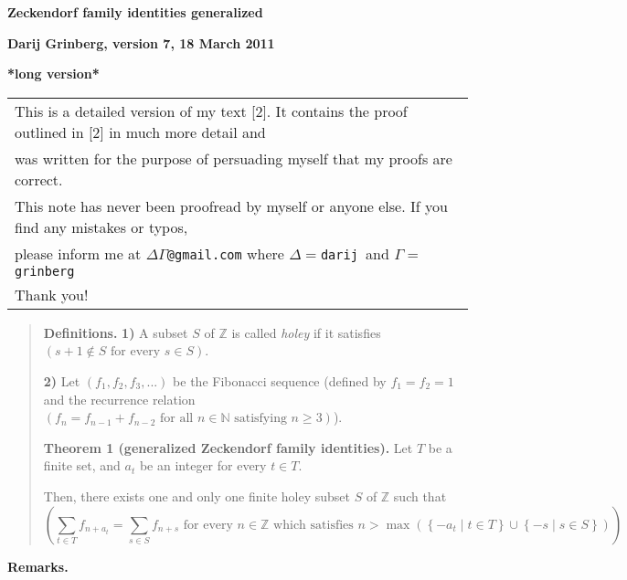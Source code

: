 \documentclass[12pt,final,notitlepage,onecolumn]{article}%
\begin{document}


\begin{center}
\textbf{Zeckendorf family identities generalized}

\textbf{Darij Grinberg, version 7, 18 March 2011}

\textbf{*long version*}
\end{center}

%

\begin{tabular}
[c]{||l||}\hline\hline
This is a detailed version of my text [2]. It contains the proof outlined in
[2] in much more detail and\\
was written for the purpose of persuading myself that my proofs are correct.\\
This note has never been proofread by myself or anyone else. If you find any
mistakes or typos,\\
please inform me at $\Delta\Gamma$\texttt{@gmail.com} where $\Delta
=$\texttt{darij }and $\Gamma=$\texttt{grinberg}\\
Thank you!\\\hline\hline
\end{tabular}


\bigskip

\begin{quote}
\textbf{Definitions.} \textbf{1)} A subset $S$ of $\mathbb{Z}$ is called
\textit{holey} if it satisfies $\left(  s+1\notin S\text{ for every }s\in
S\right)  $.

\textbf{2)} Let $\left(  f_{1},f_{2},f_{3},...\right)  $ be the Fibonacci
sequence (defined by $f_{1}=f_{2}=1$ and the recurrence relation $\left(
f_{n}=f_{n-1}+f_{n-2}\text{ for all }n\in\mathbb{N}\text{ satisfying }%
n\geq3\right)  $).

\textbf{Theorem 1 (generalized Zeckendorf family identities).} Let $T$ be a
finite set, and $a_{t}$ be an integer for every $t\in T$.

Then, there exists one and only one finite holey subset $S$ of $\mathbb{Z}$
such that
\[
\left(  \sum\limits_{t\in T}f_{n+a_{t}}=\sum\limits_{s\in S}f_{n+s}\text{ for
every }n\in\mathbb{Z}\text{ which satisfies }n>\max\left(  \left\{  -a_{t}\mid
t\in T\right\}  \cup\left\{  -s\mid s\in S\right\}  \right)  \right)  .
\]



\end{quote}

\textbf{Remarks.}
\end{document}
